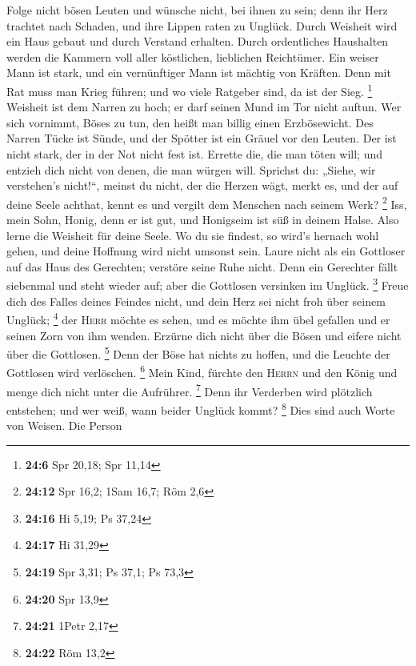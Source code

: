  Folge nicht bösen Leuten und wünsche nicht, bei ihnen zu
sein;  denn ihr Herz trachtet nach Schaden, und ihre
Lippen raten zu Unglück.  Durch Weisheit wird ein Haus
gebaut und durch Verstand erhalten.  Durch ordentliches
Haushalten werden die Kammern voll aller köstlichen, lieblichen
Reichtümer.  Ein weiser Mann ist stark, und ein
vernünftiger Mann ist mächtig von Kräften.  Denn mit Rat
muss man Krieg führen; und wo viele Ratgeber sind, da ist der Sieg.
\footnote{\textbf{24:6} Spr 20,18; Spr 11,14}  Weisheit
ist dem Narren zu hoch; er darf seinen Mund im Tor nicht auftun.
 Wer sich vornimmt, Böses zu tun, den heißt man billig
einen Erzbösewicht.  Des Narren Tücke ist Sünde, und der
Spötter ist ein Gräuel vor den Leuten.  Der ist nicht
stark, der in der Not nicht fest ist.  Errette die, die
man töten will; und entzieh dich nicht von denen, die man würgen will.
 Sprichst du: „Siehe, wir verstehen's nicht!{}``, meinst
du nicht, der die Herzen wägt, merkt es, und der auf deine Seele
achthat, kennt es und vergilt dem Menschen nach seinem Werk? \footnote{\textbf{24:12}
  Spr 16,2; 1Sam 16,7; Röm 2,6}  Iss, mein Sohn, Honig,
denn er ist gut, und Honigseim ist süß in deinem Halse. 
Also lerne die Weisheit für deine Seele. Wo du sie findest, so wird's
hernach wohl gehen, und deine Hoffnung wird nicht umsonst sein.
 Laure nicht als ein Gottloser auf das Haus des
Gerechten; verstöre seine Ruhe nicht.  Denn ein Gerechter
fällt siebenmal und steht wieder auf; aber die Gottlosen versinken im
Unglück. \footnote{\textbf{24:16} Hi 5,19; Ps 37,24} 
Freue dich des Falles deines Feindes nicht, und dein Herz sei nicht froh
über seinem Unglück; \footnote{\textbf{24:17} Hi 31,29} 
der \textsc{Herr} möchte es sehen, und es möchte ihm übel gefallen und
er seinen Zorn von ihm wenden.  Erzürne dich nicht über
die Bösen und eifere nicht über die Gottlosen. \footnote{\textbf{24:19}
  Spr 3,31; Ps 37,1; Ps 73,3}  Denn der Böse hat nichts
zu hoffen, und die Leuchte der Gottlosen wird verlöschen. \footnote{\textbf{24:20}
  Spr 13,9}  Mein Kind, fürchte den \textsc{Herrn} und
den König und menge dich nicht unter die Aufrührer. \footnote{\textbf{24:21}
  1Petr 2,17}  Denn ihr Verderben wird plötzlich
entstehen; und wer weiß, wann beider Unglück kommt? \footnote{\textbf{24:22}
  Röm 13,2}  Dies sind auch Worte von Weisen. Die Person
